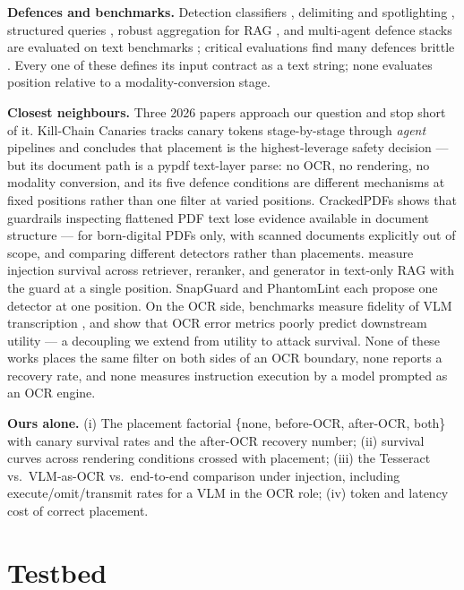 \textbf{Defences and benchmarks.} Detection classifiers \citep{jacob2025145,li2024770},
delimiting and spotlighting \citep{hines2024720}, structured queries \citep{chen2024363},
robust aggregation for RAG \citep{xiang2024556}, and multi-agent defence stacks
\citep{hossain2025285} are evaluated on text benchmarks \citep{yi2023197,debenedetti2024352};
critical evaluations find many defences brittle \citep{jia2025333,deep2026887}. Every one
of these defines its input contract as a text string; none evaluates position relative to
a modality-conversion stage.

\textbf{Closest neighbours.} Three 2026 papers approach our question and stop short of it.
Kill-Chain Canaries \citep{wang2026013} tracks canary tokens stage-by-stage through
\emph{agent} pipelines and concludes that placement is the highest-leverage safety
decision --- but its document path is a pypdf text-layer parse: no OCR, no rendering, no
modality conversion, and its five defence conditions are different mechanisms at fixed
positions rather than one filter at varied positions. CrackedPDFs
\citep{thienpreecha2026396} shows that guardrails inspecting flattened PDF text lose
evidence available in document structure --- for born-digital PDFs only, with scanned
documents explicitly out of scope, and comparing different detectors rather than
placements. \citet{yin2026017} measure injection survival across retriever, reranker, and
generator in text-only RAG with the guard at a single position. SnapGuard
\citep{du2026562} and PhantomLint \citep{murray2025884} each propose one detector at one
position. On the OCR side, benchmarks measure fidelity of VLM transcription
\citep{liu2023895,wang2025015,lee2026617,he2025168}, and \citet{sun2026911} show that OCR
error metrics poorly predict downstream utility --- a decoupling we extend from utility to
attack survival. None of these works places the same filter on both sides of an OCR
boundary, none reports a recovery rate, and none measures instruction execution by a
model prompted as an OCR engine.

\textbf{Ours alone.} (i) The placement factorial \{none, before-OCR, after-OCR, both\}
with canary survival rates and the after-OCR recovery number; (ii) survival curves across
rendering conditions crossed with placement; (iii) the Tesseract vs.\ VLM-as-OCR vs.\
end-to-end comparison under injection, including execute/omit/transmit rates for a VLM in
the OCR role; (iv) token and latency cost of correct placement.

\section{Testbed}
\label{sec:method}


